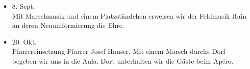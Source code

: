 \begin{history}
\begin{itemize}
        \item 8. Sept.\\
              Mit Marschmusik und einem Platzständchen erweisen wir der Feldmusik Rain
              an deren Neuuniformierung die Ehre.

        \item 20. Okt.\\
              Pfarrereinsetzung Pfarrer Josef Hauser. Mit einem Marsch durchs Dorf
              begeben wir uns in die Aula. Dort unterhalten wir die Gäste beim Apéro.

    \end{itemize}

\end{history}
